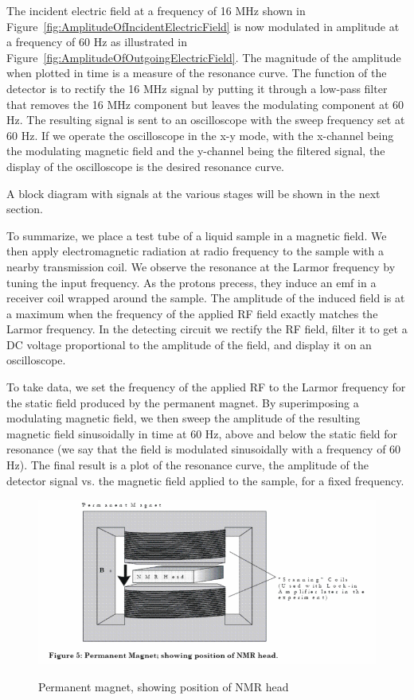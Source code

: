 \documentclass{../lab}
\begin{document}
The incident electric field at a frequency of 16 MHz shown in Figure~\ref{fig:AmplitudeOfIncidentElectricField} is now modulated in amplitude at a frequency of 60 Hz as illustrated in Figure~\ref{fig:AmplitudeOfOutgoingElectricField}. The magnitude of the amplitude when plotted in time is a measure of the resonance curve. The function of the detector is to rectify the 16 MHz signal by putting it through a low-pass filter that removes the 16 MHz component but leaves the modulating component at 60 Hz. The resulting signal is sent to an oscilloscope with the sweep frequency set at 60 Hz. If we operate the oscilloscope in the x-y mode, with the x-channel being the modulating magnetic field and the y-channel being the filtered signal, the display of the oscilloscope is the desired resonance curve.

A block diagram with signals at the various stages will be shown in the next section.

To summarize, we place a test tube of a liquid sample in a magnetic field. We then apply electromagnetic radiation at radio frequency to the sample with a nearby transmission coil. We observe the resonance at the Larmor frequency by tuning the input frequency. As the protons precess, they induce an emf in a receiver coil wrapped around the sample. The amplitude of the induced field is at a maximum when the frequency of the applied RF field exactly matches the Larmor frequency. In the detecting circuit we rectify the RF field, filter it to get a DC voltage proportional to the amplitude of the field, and display it on an oscilloscope.

To take data, we set the frequency of the applied RF to the Larmor frequency for the static field produced by the permanent magnet. By superimposing a modulating magnetic field, we then sweep the amplitude of the resulting magnetic field sinusoidally in time at 60 Hz, above and below the static field for resonance (we say that the field is modulated sinusoidally with a frequency of 60 Hz). The final result is a plot of the resonance curve, the amplitude of the detector signal vs. the magnetic field applied to the sample, for a fixed frequency.

\begin{figure}[h]
    \centering
    \href{http://experimentationlab.berkeley.edu/sites/default/files/images/700px-NMR9.gif}{\includegraphics[width=0.5\linewidth]{images/700px-NMR9.png}}
    \caption{Permanent magnet, showing position of NMR head}
    \label{fig:700px-NMR9}
\end{figure}
\end{document}
